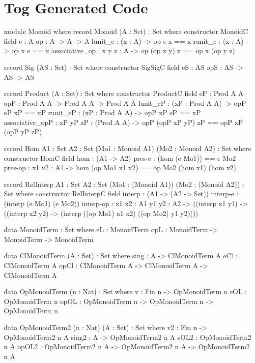 \chapter{Tog Generated Code}
\label{appendix:generatedTog}
\begin{togcode} 
module Monoid  where
  record Monoid (A : Set) : Set where
   constructor MonoidC
   field
     e : A
     op : A -> A -> A
     lunit_e : (x : A) -> op e x == x
     runit_e : (x : A) -> op x e == x
     associative_op : {x y z : A} -> op (op x y) z == op x (op y z)
\end{togcode} 
\begin{togcode}          
  record Sig (AS : Set) : Set where
   constructor SigSigC
   field
     eS : AS
     opS : AS -> AS -> AS
 
  record Product (A : Set) : Set where
   constructor ProductC
   field
     eP : Prod A A
     opP : Prod A A -> Prod A A -> Prod A A
     lunit_eP : (xP : Prod A A) -> opP eP xP == xP
     runit_eP : (xP : Prod A A) -> opP xP eP == xP
     associative_opP : {xP yP zP : (Prod A A)} -> 
                       opP (opP xP yP) zP == opP xP (opP yP zP)
\end{togcode}                
\begin{togcode}                       
  record Hom {A1 : Set} {A2 : Set} 
             (Mo1 : Monoid A1) (Mo2 : Monoid A2) : Set where
   constructor HomC
   field
     hom : (A1 -> A2)
     pres-e : (hom (e Mo1)) == e Mo2
     pres-op : {x1 x2 : A1} -> 
               hom (op Mo1 x1 x2) == op Mo2 (hom x1) (hom x2)
 
  record RelInterp {A1 : Set} {A2 : Set} 
             (Mo1 : (Monoid A1)) (Mo2 : (Monoid A2)) : Set where
   constructor RelInterpC
   field
     interp : (A1 -> (A2 -> Set))
     interp-e : (interp (e Mo1) (e Mo2))
     interp-op : {x1 x2 : A1} {y1 y2 : A2} ->
                    ((interp x1 y1) -> ((interp x2 y2) ->
                    (interp ((op Mo1) x1 x2) ((op Mo2) y1 y2))))
\end{togcode} 
\begin{togcode}                     
  data MonoidTerm : Set where
    eL : MonoidTerm
    opL : MonoidTerm -> MonoidTerm -> MonoidTerm
    
  data ClMonoidTerm (A : Set) : Set where
    sing : A -> ClMonoidTerm A
    eCl : ClMonoidTerm A
    opCl : ClMonoidTerm A -> ClMonoidTerm A -> ClMonoidTerm A
    
  data OpMonoidTerm (n : Nat) : Set where
    v : Fin n -> OpMonoidTerm n
    eOL : OpMonoidTerm n
    opOL : OpMonoidTerm n -> OpMonoidTerm n -> OpMonoidTerm n
    
  data OpMonoidTerm2 (n : Nat) (A : Set) : Set where
    v2 : Fin n -> OpMonoidTerm2 n A
    sing2 : A -> OpMonoidTerm2 n A
    eOL2 : OpMonoidTerm2 n A
    opOL2 : OpMonoidTerm2 n A -> OpMonoidTerm2 n A -> OpMonoidTerm2 n A
\end{togcode} 
